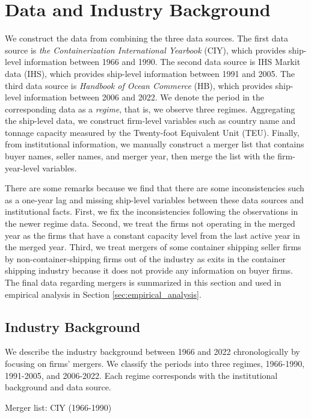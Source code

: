\documentclass[10pt]{article}
\begin{document}
\section{Data and Industry Background}

We construct the data from combining the three data sources. 
The first data source is \textit{the Containerization International Yearbook} (CIY), which provides ship-level information between 1966 and 1990.
The second data source is IHS Markit data (IHS), which provides ship-level information between 1991 and 2005.
The third data source is \textit{Handbook of Ocean Commerce} (HB), which provides ship-level information between 2006 and 2022. 
We denote the period in the corresponding data as a \textit{regime}, that is, we observe three regimes.
Aggregating the ship-level data, we construct firm-level variables such as country name and tonnage capacity measured by the Twenty-foot Equivalent Unit (TEU). 
Finally, from institutional information, we manually construct a merger list that contains buyer names, seller names, and merger year, then merge the list with the firm-year-level variables. 

There are some remarks because we find that there are some inconsistencies such as a one-year lag and missing ship-level variables between these data sources and institutional facts. 
First, we fix the inconsistencies following the observations in the newer regime data. 
Second, we treat the firms not operating in the merged year as the firms that have a constant capacity level from the last active year in the merged year. %
Third, we treat mergers of some container shipping seller firms by non-container-shipping firms out of the industry as exits in the container shipping industry because it does not provide any information on buyer firms.
The final data regarding mergers is summarized in this section and used in empirical analysis in Section \ref{sec:empirical_analysis}.

\subsection{Industry Background}
We describe the industry background between 1966 and 2022 chronologically by focusing on firms' mergers. 
We classify the periods into three regimes, 1966-1990, 1991-2005, and 2006-2022. Each regime corresponds with the institutional background and data source.

\begin{table}[!htbp]
  \begin{center}
      \caption{Merger list: CIY (1966-1990)}
      \label{tb:merger_list_CIY} 
      
  \end{center}\footnotesize
\end{table} 
\end{document}
